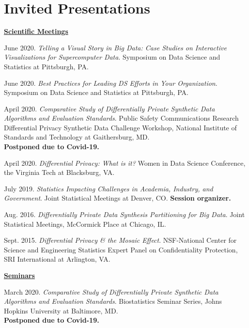 \documentclass[11pt, letterpaper, roman]{moderncv} %
\begin{document}

\section{Invited Presentations}

\underline{\textbf{\large Scientific Meetings}}\normalsize
\vspace{6pt}
\begin{etaremune}[topsep=0pt, itemsep=6pt, partopsep=0pt, parsep=0pt]
    \item June 2020. \textit{Telling a Visual Story in Big Data: Case Studies on Interactive Visualizations for Supercomputer Data}. Symposium on Data Science and Statistics at Pittsburgh, PA.
  
    \item June 2020. \textit{Best Practices for Leading DS Efforts in Your Organization}. Symposium on Data Science and Statistics at Pittsburgh, PA.  
  
    \item April 2020. \textit{Comparative Study of Differentially Private Synthetic Data Algorithms and Evaluation Standards}. Public Safety Communications Research Differential Privacy Synthetic Data Challenge Workshop, National Institute of Standards and Technology at Gaithersburg, MD.\\
  \textbf{Postponed due to Covid-19.}
  
    \item April 2020. \textit{Differential Privacy: What is it?} Women in Data Science Conference, the Virginia Tech at Blacksburg, VA.

    \item July 2019. \textit{Statistics Impacting Challenges in Academia, Industry, and Government}. Joint Statistical Meetings at Denver, CO. \textbf{Session organizer.}

    \item Aug. 2016. \textit{Differentially Private Data Synthesis Partitioning for Big Data}. Joint Statistical Meetings, McCormick Place at Chicago, IL.
    
    \item Sept. 2015. \textit{Differential Privacy \& the Mosaic Effect}. NSF-National Center for Science and Engineering Statistics Expert Panel on Confidentiality Protection, SRI International at Arlington, VA.

\vspace{5pt}
\hspace{-0.30in}\underline{\textbf{\large Seminars}}\normalsize
  \item March 2020. \textit{Comparative Study of Differentially Private Synthetic Data Algorithms and Evaluation Standards}. Biostatistics Seminar Series, Johns Hopkins University at Baltimore, MD.\\
  \textbf{Postponed due to Covid-19.}
  

\end{etaremune}
\end{document}
